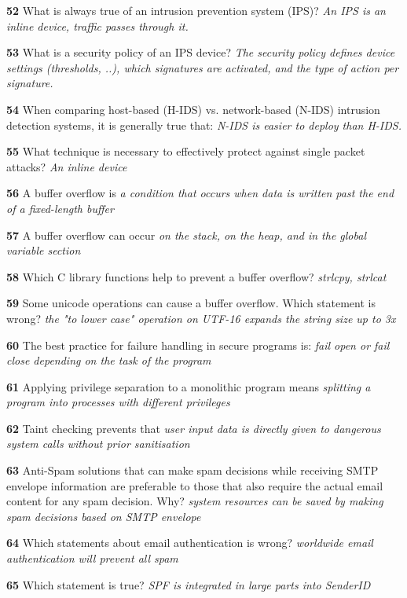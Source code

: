 \textbf{  52}  What is always true of an intrusion prevention system (IPS)?  
\textit{ An IPS is an inline device, traffic passes through it.}

\textbf{  53}  What is a security policy of an IPS device?  
\textit{ The security policy defines device settings (thresholds, ..), which signatures are activated, and the type of action per signature.}

\textbf{  54}  When comparing host-based (H-IDS) vs. network-based (N-IDS) intrusion detection systems, it is generally true that: 
\textit{ N-IDS is easier to deploy than H-IDS.}

\textbf{  55}  What technique is necessary to effectively protect against single packet attacks?  
\textit{ An inline device}

\textbf{  56}  A buffer overflow is  
\textit{ a condition that occurs when data is written past the end of a fixed-length buffer}

\textbf{  57}  A buffer overflow can occur  
\textit{ on the stack, on the heap, and in the global variable section}

\textbf{  58}  Which C library functions help to prevent a buffer overflow?  
\textit{ strlcpy, strlcat}

\textbf{  59}  Some unicode operations can cause a buffer overflow. Which statement is wrong?  
\textit{ the "to lower case" operation on UTF-16 expands the string size up to 3x}

\textbf{  60}  The best practice for failure handling in secure programs is:  
\textit{ fail open or fail close depending on the task of the program}

\textbf{  61}  Applying privilege separation to a monolithic program means  
\textit{ splitting a program into processes with different privileges}

\textbf{  62}  Taint checking prevents that  
\textit{ user input data is directly given to dangerous system calls without prior sanitisation}

\textbf{  63}  Anti-Spam solutions that can make spam decisions while receiving SMTP envelope information are preferable to those that also require the actual email content for any spam decision. Why? 
\textit{ system resources can be saved by making spam decisions based on SMTP envelope}

\textbf{  64}  Which statements about email authentication is wrong?  
\textit{ worldwide email authentication will prevent all spam}

\textbf{  65}  Which statement is true?  
\textit{ SPF is integrated in large parts into SenderID}

